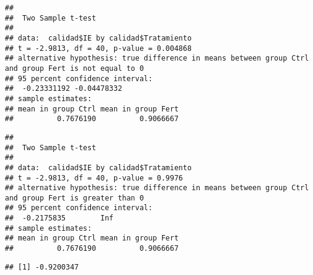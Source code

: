 \documentclass[
]{article}
\newenvironment{Shaded}{\begin{snugshade}}{\end{snugshade}}
\newcommand{\AttributeTok}[1]{\textcolor[rgb]{0.13,0.29,0.53}{#1}}
\newcommand{\CommentTok}[1]{\textcolor[rgb]{0.56,0.35,0.01}{\textit{#1}}}
\newcommand{\ConstantTok}[1]{\textcolor[rgb]{0.56,0.35,0.01}{#1}}
\newcommand{\ControlFlowTok}[1]{\textcolor[rgb]{0.13,0.29,0.53}{\textbf{#1}}}
\newcommand{\DecValTok}[1]{\textcolor[rgb]{0.00,0.00,0.81}{#1}}
\newcommand{\FunctionTok}[1]{\textcolor[rgb]{0.13,0.29,0.53}{\textbf{#1}}}
\newcommand{\NormalTok}[1]{#1}
\newcommand{\OtherTok}[1]{\textcolor[rgb]{0.56,0.35,0.01}{#1}}
\newcommand{\SpecialCharTok}[1]{\textcolor[rgb]{0.81,0.36,0.00}{\textbf{#1}}}
\newcommand{\StringTok}[1]{\textcolor[rgb]{0.31,0.60,0.02}{#1}}
\begin{document}
\begin{verbatim}
## 
##  Two Sample t-test
## 
## data:  calidad$IE by calidad$Tratamiento
## t = -2.9813, df = 40, p-value = 0.004868
## alternative hypothesis: true difference in means between group Ctrl and group Fert is not equal to 0
## 95 percent confidence interval:
##  -0.23331192 -0.04478332
## sample estimates:
## mean in group Ctrl mean in group Fert 
##          0.7676190          0.9066667
\end{verbatim}

\begin{Shaded}
\end{Shaded}

\begin{verbatim}
## 
##  Two Sample t-test
## 
## data:  calidad$IE by calidad$Tratamiento
## t = -2.9813, df = 40, p-value = 0.9976
## alternative hypothesis: true difference in means between group Ctrl and group Fert is greater than 0
## 95 percent confidence interval:
##  -0.2175835        Inf
## sample estimates:
## mean in group Ctrl mean in group Fert 
##          0.7676190          0.9066667
\end{verbatim}

\begin{Shaded}
\end{Shaded}

\begin{verbatim}
## [1] -0.9200347
\end{verbatim}
\end{document}
